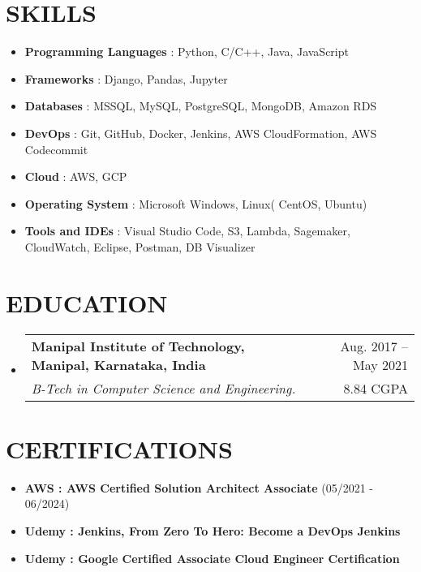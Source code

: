 \documentclass[letterpaper,11pt]{article}
\makeatletter
\newcommand{\resumeSubheading}[4]{
  \vspace{-1pt}\item
    \begin{tabular*}{\textwidth}[t]{l@{\extracolsep{\fill}}r}
      \textbf{#1} & {\color{dark-grey}\small #2}\vspace{1pt}\\ %
      \textit{#3} & {\color{dark-grey} \small #4}\\ %
    \end{tabular*}\vspace{-4pt}
}
\newcommand{\resumeSubHeadingListStart}{\begin{itemize}[leftmargin=0in, label={}]}
\newcommand{\resumeSubHeadingListEnd}{\end{itemize}}
\makeatother
\begin{document}
\section{SKILLS}
 \begin{itemize}
    \item \textbf{Programming Languages} {: Python, C/C++, Java, JavaScript}\vspace{2pt} \\
    \item \textbf{Frameworks} {: Django, Pandas, Jupyter}\vspace{2pt} \\
    \item \textbf{Databases} {: MSSQL, MySQL, PostgreSQL, MongoDB, Amazon RDS}\vspace{2pt} \\
    \item \textbf{DevOps} {: Git, GitHub, Docker, Jenkins, AWS CloudFormation, AWS Codecommit}\vspace{2pt} \\
    \item \textbf{Cloud}     {: AWS, GCP}\vspace{2pt} \\
    \item \textbf{Operating System} {: Microsoft Windows, Linux( CentOS, Ubuntu)}\vspace{2pt} \\
    \item \textbf{Tools and IDEs} {: Visual Studio Code, S3, Lambda, Sagemaker, CloudWatch, Eclipse, Postman, DB Visualizer}\vspace{2pt} \\
 \end{itemize}
 


\section {EDUCATION}
  \resumeSubHeadingListStart
    \resumeSubheading
      {Manipal Institute of Technology, Manipal, Karnataka, India}{Aug. 2017 -- May 2021}
      {B-Tech in Computer Science and Engineering. }{8.84 CGPA}
  \resumeSubHeadingListEnd

\section{CERTIFICATIONS}
 \begin{itemize}
    \item \textbf{AWS : AWS Certified Solution Architect Associate} {(05/2021 - 06/2024)}\vspace{2pt} \\
    \item \textbf{Udemy : Jenkins, From Zero To Hero: Become a DevOps Jenkins} \\
    \item \textbf{Udemy : Google Certified Associate Cloud Engineer
Certification } \\
 \end{itemize}
 
\end{document}
